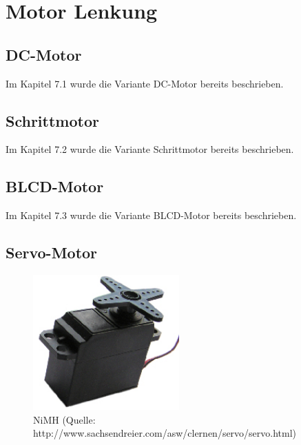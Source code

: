 
\section{Motor Lenkung}


\subsection{DC-Motor}

Im Kapitel 7.1 wurde die Variante DC-Motor bereits beschrieben.


\subsection{Schrittmotor}
Im Kapitel 7.2 wurde die Variante Schrittmotor bereits beschrieben.

\subsection{BLCD-Motor}
Im Kapitel 7.3 wurde die Variante BLCD-Motor bereits beschrieben.

\subsection{Servo-Motor}

\begin{figure}[h!]%
\centering
\includegraphics[width=0.5\textwidth]{fig/servo.jpg}
\caption{NiMH (Quelle: http://www.sachsendreier.com/asw/clernen/servo/servo.html)}
\label{fig:Java}
\end{figure}


